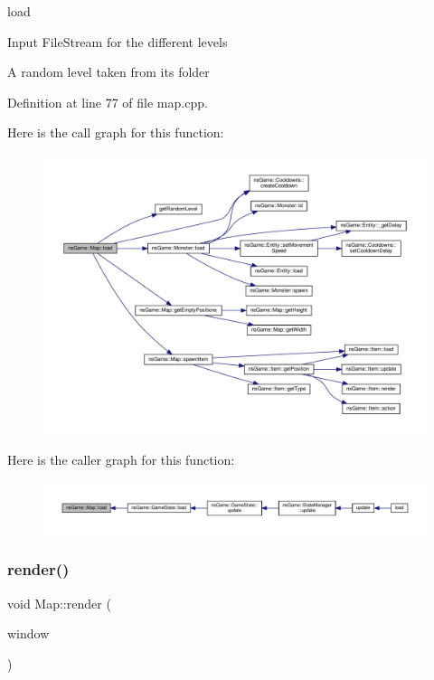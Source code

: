 load 

Input File\+Stream for the different levels

A random level taken from its folder 

Definition at line 77 of file map.\+cpp.

Here is the call graph for this function\+:\nopagebreak
\begin{figure}[H]
\begin{center}
\leavevmode
\includegraphics[width=350pt]{classns_game_1_1_map_a11fd1b88b5f3c923dad2c88df16e4373_cgraph}
\end{center}
\end{figure}
Here is the caller graph for this function\+:\nopagebreak
\begin{figure}[H]
\begin{center}
\leavevmode
\includegraphics[width=350pt]{classns_game_1_1_map_a11fd1b88b5f3c923dad2c88df16e4373_icgraph}
\end{center}
\end{figure}
\mbox{\label{classns_game_1_1_map_a3660d6272f910c1b702c4e8f3f463f2b}} 
\subsubsection{\texorpdfstring{render()}{render()}}
{\footnotesize\ttfamily void Map\+::render (\begin{DoxyParamCaption}\item[{Min\+GL \&}]{window }\end{DoxyParamCaption})}



